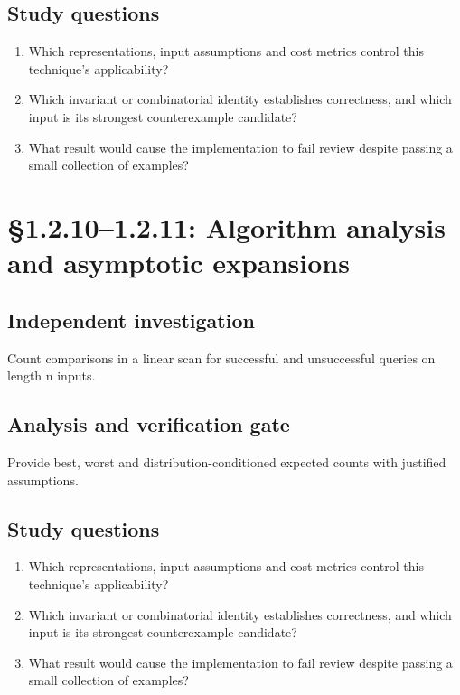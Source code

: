 \documentclass[11pt,letterpaper]{article}
\begin{document}
\subsection{Study questions}
\begin{enumerate}
\item Which representations, input assumptions and cost metrics control this technique's applicability?
\item Which invariant or combinatorial identity establishes correctness, and which input is its strongest counterexample candidate?
\item What result would cause the implementation to fail review despite passing a small collection of examples?
\end{enumerate}

\section{\S 1.2.10--1.2.11: Algorithm analysis and asymptotic expansions}
\subsection{Independent investigation}
Count comparisons in a linear scan for successful and unsuccessful queries on length n inputs.
\subsection{Analysis and verification gate}
Provide best, worst and distribution-conditioned expected counts with justified assumptions.
\subsection{Study questions}
\begin{enumerate}
\item Which representations, input assumptions and cost metrics control this technique's applicability?
\item Which invariant or combinatorial identity establishes correctness, and which input is its strongest counterexample candidate?
\item What result would cause the implementation to fail review despite passing a small collection of examples?
\end{enumerate}
\end{document}
